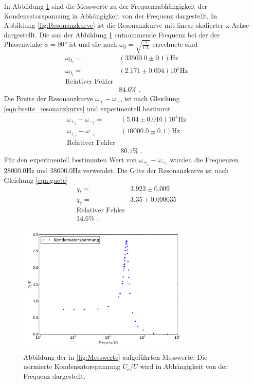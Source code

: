 In Abbildung \ref{fig:Kondensatorspannung} sind die
Messwerte zu der Frequenzabhängigkeit der Kondensatorspannung in Abhängigkeit
von der Frequenz dargestellt. In Abbildung \ref{fig:Resonanzkurve} ist die
Resonanzkurve mit linear skalierter x-Achse dargestellt. Die aus der Abbildung
\ref{fig:Kondensatorspannung}
entnommende Frequenz bei der der Phasenwinke $\phi=90°$ ist und die
nach $\omega_0=\sqrt{\frac{1}{CL}}$ errechnete sind
\begin{align*}
\omega_{0_e}=&(33500.0\pm0.1)\si{\hertz}\\
\omega_{0_t}=&(2.171\pm0.004)10^5\si{\hertz}\\
\text{Relativer Fehler}\\
 &84.6\%\;.
\end{align*}
 Die Breite der
Resonanzkurve $\omega_+-\omega_- $, ist nach Gleichung \eqref{eqn:breite_resonanzkurve}
 und experimentell bestimmt
\begin{align*}
 \omega_{+_t}-\omega_{-_t}=&(5.04\pm0.016)10^4\si{\hertz}\\
 \omega_{+_e}-\omega_{-_e}=&(10000.0\pm0.1)\si{\hertz}\\
 \text{Relativer Fehler}\\
  &80.1\%\;.
\end{align*}
Für den experimentell bestimmten Wert von $\omega_{+_e}-\omega_{-_e}$ wurden
die Frequenzen $28000.0\si{\hertz}$ und $38000.0\si{\hertz}$ verwendet.
Die Güte der Resonanzkurve ist nach Gleichung \eqref{eqn:guete}
\begin{align*}
  q_t=&3.923\pm0.009\\
  q_e=&3.35\pm0.000035\\
  \text{Relativer Fehler}\\
  14.6\%\;.
\end{align*}
\begin{figure}
  \centering
  \includegraphics[width=0.78\textwidth]{Kondensatorspannung.pdf}
  \caption{Abbildung der in \ref{fig:Messwerte} aufgeführten Messwerte.
  Die normierte Kondensatorspannung $U_c/U$ wird in Abhängigkeit von der
  Frequenz dargestellt.}
  \label{fig:Kondensatorspannung}
\end{figure}
